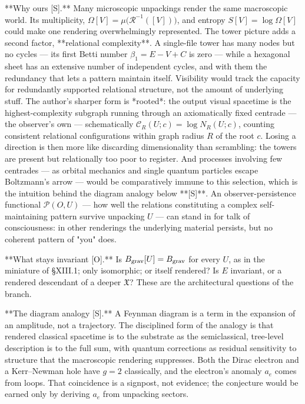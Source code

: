 **Why ours [S].** Many microscopic unpackings render the same macroscopic world. Its multiplicity, $\Omega[V] = \mu\big(\mathcal R^{-1}([V])\big)$, and entropy $S[V] = \log\Omega[V]$ could make one rendering overwhelmingly represented. The tower picture adds a second factor, **relational complexity**. A single-file tower has many nodes but no cycles — its first Betti number $\beta_1 = E-V+C$ is zero — while a hexagonal sheet has an extensive number of independent cycles, and with them the redundancy that lets a pattern maintain itself. Visibility would track the capacity for redundantly supported relational structure, not the amount of underlying stuff. The author's sharper form is *rooted*: the output visual spacetime is the highest-complexity subgraph running through an axiomatically fixed centrade — the observer's own — schematically $\mathcal C_R(U;c) = \log N_R(U;c)$, counting consistent relational configurations within graph radius $R$ of the root $c$. Losing a direction is then more like discarding dimensionality than scrambling: the towers are present but relationally too poor to register. And processes involving few centrades — as orbital mechanics and single quantum particles escape Boltzmann's arrow — would be comparatively immune to this selection, which is the intuition behind the diagram analogy below **[S]**. An observer-persistence functional $\mathscr P(O,U)$ — how well the relations constituting a complex self-maintaining pattern survive unpacking $U$ — can stand in for talk of consciousness: in other renderings the underlying material persists, but no coherent pattern of "you" does.

**What stays invariant [O].** Is $B_{\rm grav}[U] = B_{\rm grav}$ for every $U$, as in the miniature of §XIII.1; only isomorphic; or itself rendered? Is $E$ invariant, or a rendered descendant of a deeper $\mathfrak X$? These are the architectural questions of the branch.

**The diagram analogy [S].** A Feynman diagram is a term in the expansion of an amplitude, not a trajectory. The disciplined form of the analogy is that rendered classical spacetime is to the substrate as the semiclassical, tree-level description is to the full sum, with quantum corrections as residual sensitivity to structure that the macroscopic rendering suppresses. Both the Dirac electron and a Kerr–Newman hole have $g = 2$ classically, and the electron's anomaly $a_e$ comes from loops. That coincidence is a signpost, not evidence; the conjecture would be earned only by deriving $a_e$ from unpacking sectors.

